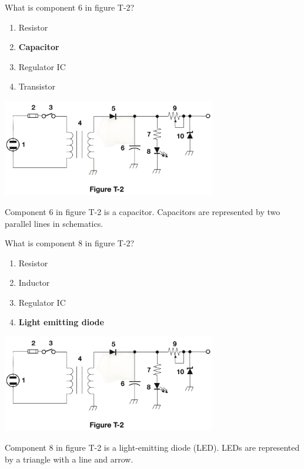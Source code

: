 \begin{tcolorbox}[
    colback=gray!10!white,
    colframe=black!75!black,
    title={T6C06},
    sidebyside,
    sidebyside align=top,
    lefthand width=0.45\textwidth
]
What is component 6 in figure T-2?
\begin{enumerate}[label=\Alph*),noitemsep]
    \item Resistor
    \item \textbf{Capacitor}
    \item Regulator IC
    \item Transistor
\end{enumerate}
\tcblower
\includegraphics[width=0.7\textwidth]{tech/images/t2.png}
\end{tcolorbox}
Component 6 in figure T-2 is a capacitor. Capacitors are represented by two parallel lines in schematics.

\begin{tcolorbox}[
    colback=gray!10!white,
    colframe=black!75!black,
    title={T6C07},
    sidebyside,
    sidebyside align=top,
    lefthand width=0.45\textwidth
]
What is component 8 in figure T-2?
\begin{enumerate}[label=\Alph*),noitemsep]
    \item Resistor
    \item Inductor
    \item Regulator IC
    \item \textbf{Light emitting diode}
\end{enumerate}
\tcblower
\includegraphics[width=0.7\textwidth]{tech/images/t2.png}
\end{tcolorbox}
Component 8 in figure T-2 is a light-emitting diode (LED). LEDs are represented by a triangle with a line and arrow.

